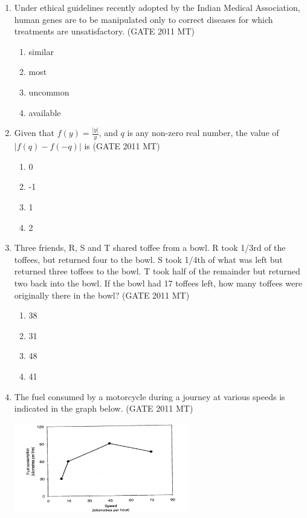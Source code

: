 \documentclass[12pt]{article}
\begin{document}
\begin{enumerate}
\item Under ethical guidelines recently adopted by the Indian Medical Association, human genes are to be manipulated only to correct diseases for which     treatments are unsatisfactory. (GATE 2011 MT)
    \begin{enumerate}
        \item similar
        \item most
        \item uncommon
        \item available
    \end{enumerate}

\item Given that $f(y) = \frac{|y|}{y}$, and $q$ is any non-zero real number, the value of $|f(q) - f(-q)|$ is (GATE 2011 MT)
    \begin{enumerate}
        \item 0
        \item -1
        \item 1
        \item 2
    \end{enumerate}

\item Three friends, R, S and T shared toffee from a bowl. R took 1/3rd of the toffees, but returned four to the bowl. S took 1/4th of what was left but returned three toffees to the bowl. T took half of the remainder but returned two back into the bowl. If the bowl had 17 toffees left, how many toffees were originally there in the bowl? (GATE 2011 MT)
    \begin{enumerate}
        \item 38
        \item 31
        \item 48
        \item 41
    \end{enumerate}

\item The fuel consumed by a motorcycle during a journey at various speeds is indicated in the graph below. (GATE 2011 MT)

\begin{center}
    \includegraphics[width=0.6\textwidth]{images/q63image1.jpg}
\end{center}


\end{enumerate}
\end{document}
